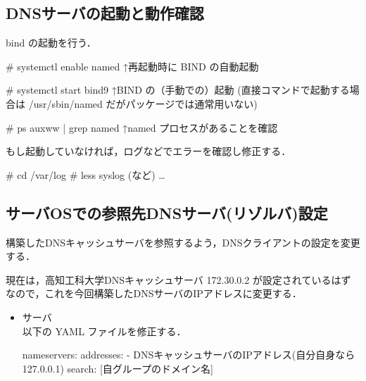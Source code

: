 

\subsection{DNSサーバの起動と動作確認}

bind の起動を行う．

\begin{cli}
# systemctl enable named
    ↑再起動時に BIND の自動起動

# systemctl start bind9
    ↑BIND の（手動での）起動
(直接コマンドで起動する場合は /usr/sbin/named だがパッケージでは通常用いない)

# ps auxww | grep named
    ↑named プロセスがあることを確認
\end{cli}

もし起動していなければ，ログなどでエラーを確認し修正する．
\begin{cli}
# cd /var/log
# less syslog (など)
 …
\end{cli}


\subsection{サーバOSでの参照先DNSサーバ(リゾルバ)設定}

構築したDNSキャッシュサーバを参照するよう，DNSクライアントの設定を変更する．

現在は，高知工科大学DNSキャッシュサーバ 172.30.0.2 が設定されているはずなので，これを今回構築したDNSサーバのIPアドレスに変更する．

\begin{itemize}
  \item サーバ\\
	 以下の YAML ファイルを修正する．
\begin{cli}
      nameservers:
        addresses:
          - DNSキャッシュサーバのIPアドレス(自分自身なら127.0.0.1)
        search: [自グループのドメイン名]
\end{cli}
\end{itemize}

